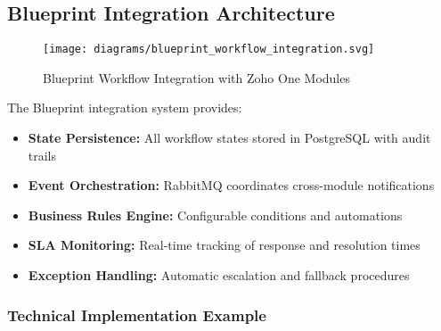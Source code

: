 \subsection{Blueprint Integration Architecture}

\begin{figure}[h]
  \centering
  \texttt{[image: diagrams/blueprint\_workflow\_integration.svg]}
  \caption{Blueprint Workflow Integration with Zoho One Modules}
\end{figure}

The Blueprint integration system provides:

\begin{itemize}
  \item \textbf{State Persistence:} All workflow states stored in PostgreSQL with audit trails
  \item \textbf{Event Orchestration:} RabbitMQ coordinates cross-module notifications
  \item \textbf{Business Rules Engine:} Configurable conditions and automations
  \item \textbf{SLA Monitoring:} Real-time tracking of response and resolution times
  \item \textbf{Exception Handling:} Automatic escalation and fallback procedures
\end{itemize}

\subsubsection{Technical Implementation Example}

